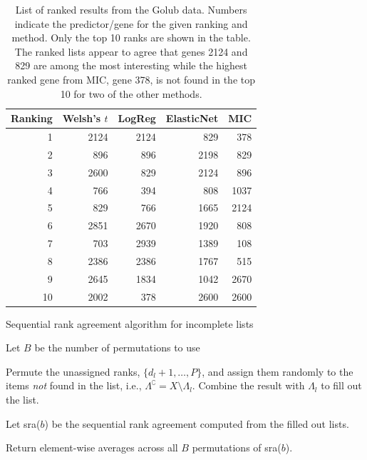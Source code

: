 \documentclass[oupdraft]{bio}
\begin{document}
\newpage

\begin{table}[tb]
\centering
\caption{List of ranked results from the Golub data. Numbers indicate
  the predictor/gene for the given ranking and method. Only the top 10
  ranks are shown in the table. The ranked lists appear to agree that
  genes 2124 and 829 are among the most interesting while the highest
  ranked gene from MIC, gene 378, is not found in the top 10 for two
  of the other methods.}
\label{tab1}
\begin{tabular}{rrrrr}
  \hline
Ranking & Welsh's $t$ & LogReg & ElasticNet & MIC \\ 
  \hline
1 & 2124 & 2124 & 829 & 378 \\ 
  2 & 896 & 896 & 2198 & 829 \\ 
  3 & 2600 & 829 & 2124 & 896 \\ 
  4 & 766 & 394 & 808 & 1037 \\ 
  5 & 829 & 766 & 1665 & 2124 \\ 
  6 & 2851 & 2670 & 1920 & 808 \\ 
  7 & 703 & 2939 & 1389 & 108 \\ 
  8 & 2386 & 2386 & 1767 & 515 \\ 
  9 & 2645 & 1834 & 1042 & 2670 \\ 
  10 & 2002 & 378 & 2600 & 2600 \\ 
   \hline
\end{tabular}
\end{table}


\newpage

\begin{algorithm}
\caption{Sequential rank agreement algorithm for incomplete lists}
\label{sra-algorithm}
\begin{algorithmic}[1]
   \State Let $B$ be the number
  of permutations to use  
  \State \parbox[t]{\dimexpr\linewidth-\algorithmicindent-1.7cm}{Permute
    the unassigned ranks, $\{d_l+1, \ldots, P\}$, and assign them
    randomly to the items \emph{not} found in the list, i.e.,
    $\Lambda^\complement=X\setminus\Lambda_l$. Combine the
    result with $\Lambda_l$ to fill out the list.}
\EndFor
\State \parbox[t]{\dimexpr\linewidth-\algorithmicindent-1cm}{Let sra($b$) be the sequential rank agreement computed from the
filled out lists.}
\EndFor
\State Return element-wise averages across all $B$ permutations of sra($b$).
\EndProcedure
\end{algorithmic}
\end{algorithm}
\end{document}
